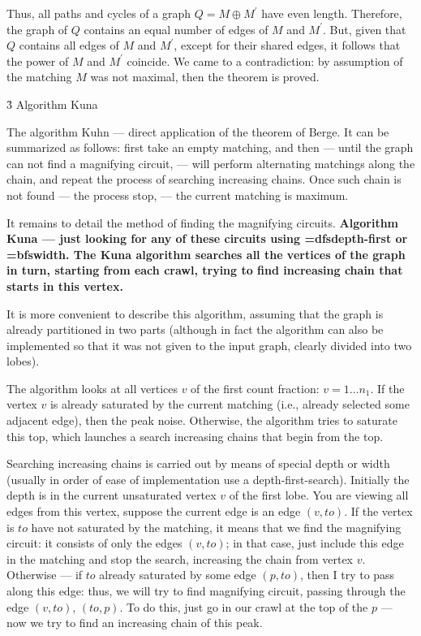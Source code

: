 Thus, all paths and cycles of a graph $Q = M \oplus M^\prime$ have even length. Therefore, the graph of $Q$ contains an equal number of edges of $M$ and $M^\prime$. But, given that $Q$ contains all edges of $M$ and $M^\prime$, except for their shared edges, it follows that the power of $M$ and $M^\prime$ coincide. We came to a contradiction: by assumption of the matching $M$ was not maximal, then the theorem is proved.


\h3{ Algorithm Kuna }

The algorithm Kuhn --- direct application of the theorem of Berge. It can be summarized as follows: first take an empty matching, and then --- until the graph can not find a magnifying circuit, --- will perform alternating matchings along the chain, and repeat the process of searching increasing chains. Once such chain is not found --- the process stop, --- the current matching is maximum.

It remains to detail the method of finding the magnifying circuits. \bf{Algorithm Kuna} --- just looking for any of these circuits using \bf{\algohref=dfs{depth-first}} or \bf{\algohref=bfs{width}}. The Kuna algorithm searches all the vertices of the graph in turn, starting from each crawl, trying to find increasing chain that starts in this vertex.

It is more convenient to describe this algorithm, assuming that the graph is already partitioned in two parts (although in fact the algorithm can also be implemented so that it was not given to the input graph, clearly divided into two lobes).

The algorithm looks at all vertices $v$ of the first count fraction: $v = 1 \ldots n_1$. If the vertex $v$ is already saturated by the current matching (i.e., already selected some adjacent edge), then the peak noise. Otherwise, the algorithm tries to saturate this top, which launches a search increasing chains that begin from the top.

Searching increasing chains is carried out by means of special depth or width (usually in order of ease of implementation use a depth-first-search). Initially the depth is in the current unsaturated vertex $v$ of the first lobe. You are viewing all edges from this vertex, suppose the current edge is an edge $(v,to)$. If the vertex is $to$ have not saturated by the matching, it means that we find the magnifying circuit: it consists of only the edges $(v,to)$; in that case, just include this edge in the matching and stop the search, increasing the chain from vertex $v$. Otherwise --- if $to$ already saturated by some edge $(p,to)$, then I try to pass along this edge: thus, we will try to find magnifying circuit, passing through the edge $(v,to)$, $(to,p)$. To do this, just go in our crawl at the top of the $p$ --- now we try to find an increasing chain of this peak.

